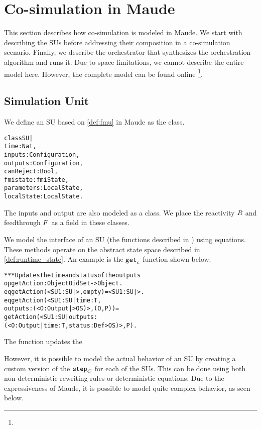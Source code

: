 \section{Co-simulation in Maude}
This section describes how co-simulation is modeled in Maude.
We start with describing the SUs before addressing their composition in a co-simulation scenario. Finally, we describe the orchestrator that synthesizes the orchestration algorithm and runs it.
Due to space limitations, we cannot describe the entire model here. 
However, the complete model can be found online \footnote{}.

\subsection{Simulation Unit}
We define an SU based on \cref{def:fmu} in Maude as the class.

\begin{alltt}
class SU |
  time : Nat, 
  inputs : Configuration, 
  outputs : Configuration,
  canReject : Bool, 
  fmistate : fmiState,
  parameters : LocalState,
  localState : LocalState .
\end{alltt}

The inputs and output are also modeled as a class. 
We place the reactivity $R$ and feedthrough $F$ as a field in these classes.

We model the interface of an SU (the functions described in ) using equations.
These methods operate on the abstract state space described in \cref{def:runtime_state}.
An example is the $\mathtt{get}_{c}$ function shown below:

\begin{alltt}
  *** Updates the time and status of the outputs
  op getAction : Object OidSet -> Object .
  eq getAction(< SU1 : SU | >, empty) = < SU1 : SU | > .
  eq getAction(< SU1 : SU | time : T, 
    outputs : (< O : Output | > OS) >, (O , P)) = 
    getAction(< SU1 : SU | outputs : 
    (< O : Output | time : T, status : Def > OS) >, P) .
\end{alltt}

The function updates the 

However, it is possible to model the actual behavior of an SU by creating a custom version of the $\mathtt{step}_{C}$ for each of the SUs. 
This can be done using both non-deterministic rewriting rules or deterministic equations.
Due to the expressiveness of Maude, it is possible to model quite complex behavior, as seen below.

